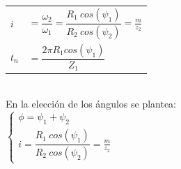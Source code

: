 \documentclass[11pt,a4paper]{article}
\begin{document}
\begin{multicols}{2}
		\begin{tabular}{l l} $i$&$=\dfrac{\omega_2}{\omega_1}=\dfrac{R_1 ~ cos(\psi_1)}{R_2 ~ cos(\psi_2)}=\frac{m}{z_2}$\\
		$t_n$&$=\dfrac{2\pi R_1 cos(\psi_1)}{Z_1}$\\
		\end{tabular}\\
		En la elección de los ángulos se plantea:\\
		$\left\{\begin{array}{l}
			\phi=\psi_1+\psi_2\\
			i=\dfrac{R_1 ~ cos(\psi_1)}{R_2 ~ cos(\psi_2)}=\frac{m}{z_2}
		\end{array} \right.$
		
		
		
		
	\end{multicols}
\end{document}
